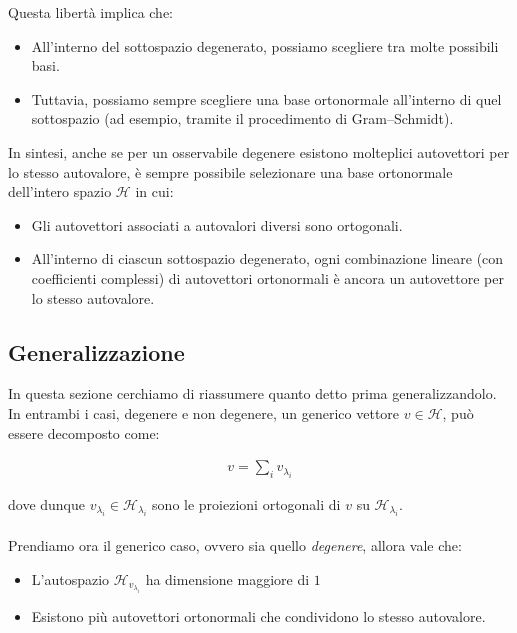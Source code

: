 	Questa libertà implica che:
\begin{itemize}
	\item  All'interno del sottospazio degenerato, possiamo scegliere tra molte possibili basi.
	\item Tuttavia, possiamo sempre scegliere una base ortonormale all'interno di quel sottospazio (ad esempio, tramite il procedimento di Gram–Schmidt).
\end{itemize}
	
	In sintesi, anche se per un osservabile degenere esistono molteplici autovettori per lo stesso autovalore, è sempre possibile selezionare una base ortonormale dell'intero spazio $\mathcal{H}$ in cui:
\begin{itemize}
	\item Gli autovettori associati a autovalori diversi sono ortogonali.
	\item All'interno di ciascun sottospazio degenerato, ogni combinazione lineare (con coefficienti complessi) di autovettori ortonormali è ancora un autovettore per lo stesso autovalore.
\end{itemize}
	
\subsection{Generalizzazione}
	
	In questa sezione cerchiamo di riassumere quanto detto prima generalizzandolo. In entrambi i casi, degenere e non degenere, un generico vettore $v \in \mathcal{H}$, può essere decomposto come:

\begin{nb}
\begin{align*}
	v = \sum_i v_{\lambda_i}
\end{align*}
\end{nb}
	
	dove dunque $v_{\lambda_i} \in \mathcal{H}_{\lambda_i}$ sono le proiezioni ortogonali di $v$ su $\mathcal{H}_{\lambda_i}$.
	\\
	\\
	Prendiamo ora il generico caso, ovvero sia quello \textit{degenere}, allora vale che:
\begin{itemize}
	\item L'autospazio $\mathcal{H}_{v_{\lambda_i}}$ ha dimensione maggiore di $1$
	\item Esistono più autovettori ortonormali che condividono lo stesso autovalore.
\end{itemize}
	
